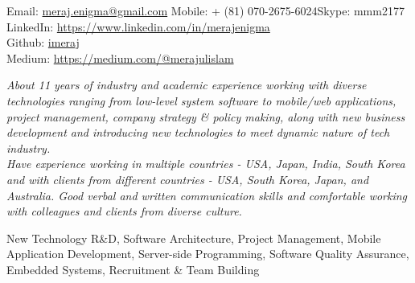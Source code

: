 \documentclass[10pt,a4paper]{article} %
\begin{document}
 



\noindent Email: \href{mailto:meraj.enigma@gmail.com}{meraj.enigma@gmail.com}\bull 
\textsmaller Mobile: {+} (81) 070-2675-6024\bull Skype: mmm2177\\
LinkedIn: \href{https://www.linkedin.com/in/merajenigma}{https://www.linkedin.com/in/merajenigma}\\
Github: \href{https://github.com/imeraj}{imeraj} \\
Medium: \href{https://medium.com/@merajulislam} {https://medium.com/@merajulislam}


\spacedhrule{0.9em}{-0.4em} %



\vspace{-1.3em} %

\begin{multicols}{2}  %
\noindent \textit{About 11 years of industry and academic experience working with diverse technologies ranging from low-level system software to mobile/web applications, project management, company strategy \& policy making, along with new business development and introducing new technologies to meet dynamic nature of tech industry.\\
Have experience working in multiple countries - USA, Japan, India, South Korea and with clients from different countries - USA, South Korea, Japan, and Australia. Good verbal and written communication skills and comfortable working with colleagues and clients from diverse culture.}
\end{multicols}

 New Technology R\&D, Software Architecture, Project Management, Mobile Application Development, Server-side Programming, Software Quality Assurance, Embedded Systems, Recruitment \& Team Building\\
\end{document}

